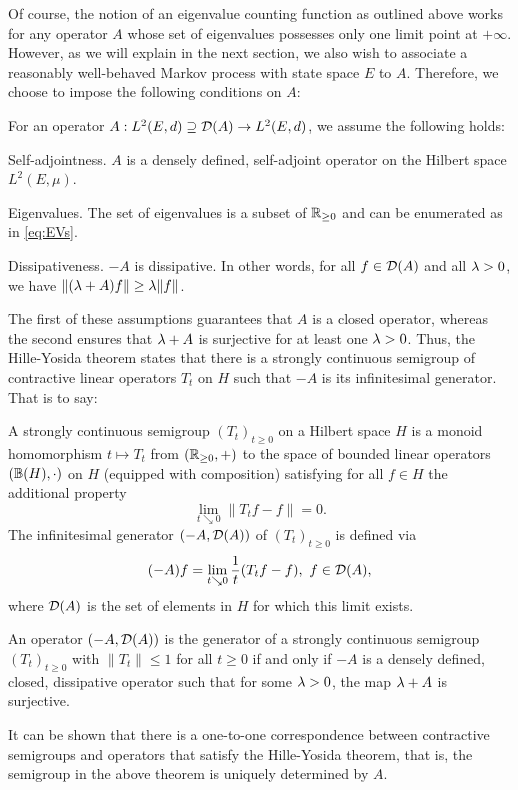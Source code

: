 Of course, the notion of an eigenvalue counting function as outlined above works for any operator $A$ whose set of eigenvalues possesses only one limit point at $+\infty$. However, as we will explain in the next section, we also wish to associate a reasonably well-behaved Markov process with state space $E$ to $A$. Therefore, we choose to impose the following conditions on $A$:
\begin{cond}\label{cond:A}
For an operator $A:L^2(E,d)\supseteq\mathcal{D}(A)\to L^2(E,d)$, we assume the following holds:
\begin{compactdesc}
  \item[Self-adjointness.] $A$ is a densely defined, self-adjoint operator on the Hilbert space $L^2(E,\mu)$.
  \item[Eigenvalues.] The set of eigenvalues is a subset of $\mathbb{R}_{\geq0}$ and can be enumerated as in \eqref{eq:EVs}.
  \item[Dissipativeness.] $-A$ is dissipative. In other words, for all $f\in\mathcal{D}(A)$ and all $\lambda>0$, we have 
  $\|(\lambda+A)f\|\geq\lambda\|f\|$.
\end{compactdesc}
\end{cond}
The first of these assumptions guarantees that $A$ is a closed operator, whereas the second ensures that $\lambda+A$ is surjective for at least one $\lambda>0$. Thus, the Hille-Yosida theorem states that there is a strongly continuous semigroup of contractive linear operators $T_t$ on $H$ such that $-A$ is its infinitesimal generator. That is to say:
\begin{defin}
  A strongly continuous semigroup $(T_t)_{t\geq0}$ on a Hilbert space $H$ is a monoid homomorphism $t\mapsto T_t$ from $(\mathbb{R}_{\geq0},+)$ to the space of bounded linear operators $(\mathbb{B}(H),\cdot)$ on $H$ (equipped with composition) satisfying for all $f\in H$ the additional property
  \[
    \lim_{t\searrow0} \|T_tf-f\|=0.
  \]
  The infinitesimal generator $(-A,\mathcal{D}(A))$ of $(T_t)_{t\geq0}$ is defined via
  \[
    (-A)f=\lim_{t\searrow0}\frac{1}{t}(T_tf-f),\ f\in\cD(A),
  \]
  where $\mathcal{D}(A)$ is the set of elements in $H$ for which this limit exists.
\end{defin}
\begin{thm}\label{thm:HY}
  An operator $(-A,\mathcal{D}(A))$ is the generator of a strongly continuous semigroup $(T_t)_{t\geq0}$ with $\|T_t\|\leq1$ for all $t\geq0$ if and only if $-A$ is a densely defined, closed, dissipative operator such that for some $\lambda>0$, the map $\lambda+A$ is surjective. 
\end{thm}
It can be shown that there is a one-to-one correspondence between contractive semigroups and operators that satisfy the Hille-Yosida theorem, that is, the semigroup in the above theorem is uniquely determined by $A$. 

